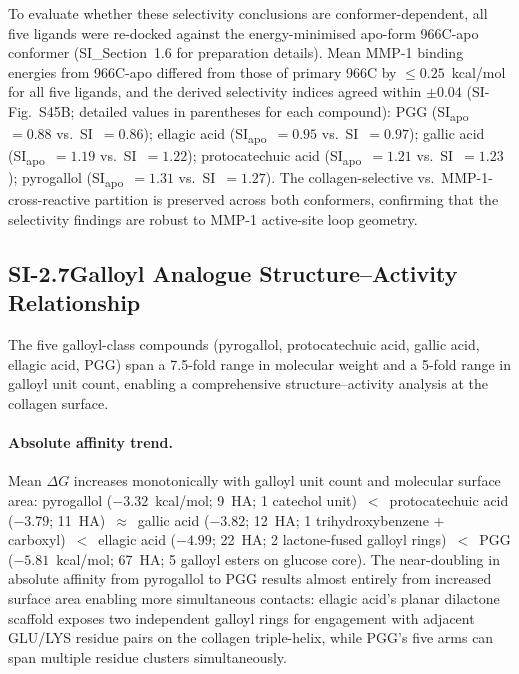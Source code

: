 \documentclass[11pt]{article}
\begin{document}
To evaluate whether these selectivity conclusions are conformer-dependent,
all five ligands were re-docked against the energy-minimised apo-form
966C-apo conformer (SI\_Section~1.6 for preparation details).
Mean MMP-1 binding energies from 966C-apo differed from those of primary 966C
by $\leq 0.25$~kcal/mol for all five ligands, and the derived selectivity
indices agreed within $\pm 0.04$ (SI-Fig.~S45B; detailed values in
parentheses for each compound):
PGG (SI\textsubscript{apo}~$= 0.88$ vs.~SI~$= 0.86$);
ellagic acid (SI\textsubscript{apo}~$= 0.95$ vs.~SI~$= 0.97$);
gallic acid (SI\textsubscript{apo}~$= 1.19$ vs.~SI~$= 1.22$);
protocatechuic acid (SI\textsubscript{apo}~$= 1.21$ vs.~SI~$= 1.23$);
pyrogallol (SI\textsubscript{apo}~$= 1.31$ vs.~SI~$= 1.27$).
The collagen-selective vs.\ MMP-1-cross-reactive partition is preserved across
both conformers, confirming that the selectivity findings are robust to
MMP-1 active-site loop geometry.


\subsection*{SI-2.7\quad Galloyl Analogue Structure--Activity Relationship}

The five galloyl-class compounds (pyrogallol, protocatechuic acid, gallic acid,
ellagic acid, PGG) span a 7.5-fold range in molecular weight and a 5-fold
range in galloyl unit count, enabling a comprehensive structure--activity
analysis at the collagen surface.

\paragraph{Absolute affinity trend.}
Mean $\Delta G$ increases monotonically with galloyl unit count and molecular
surface area:
pyrogallol ($-3.32$~kcal/mol; 9~HA; 1 catechol unit)~$<$~protocatechuic acid
($-3.79$; 11~HA)~$\approx$~gallic acid ($-3.82$; 12~HA; 1 trihydroxybenzene
+ carboxyl)~$<$~ellagic acid ($-4.99$; 22~HA; 2 lactone-fused galloyl
rings)~$<$~PGG ($-5.81$~kcal/mol; 67~HA; 5 galloyl esters on glucose core).
The near-doubling in absolute affinity from pyrogallol to PGG results almost
entirely from increased surface area enabling more simultaneous contacts:
ellagic acid's planar dilactone scaffold exposes two independent galloyl rings
for engagement with adjacent GLU/LYS residue pairs on the collagen triple-helix,
while PGG's five arms can span multiple residue clusters simultaneously.
\end{document}
